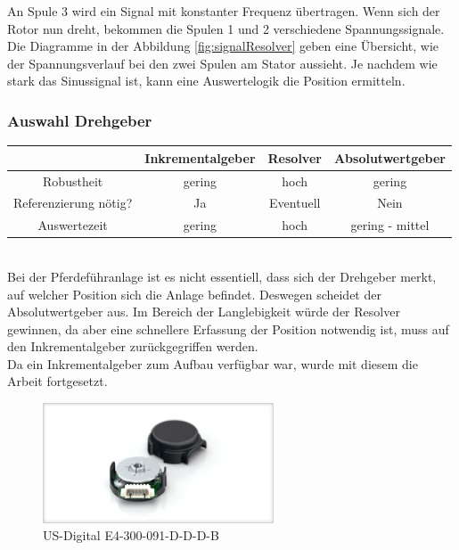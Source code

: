 An Spule 3 wird ein Signal mit konstanter Frequenz übertragen. Wenn sich der Rotor nun dreht, bekommen die Spulen 1 und 2  verschiedene Spannungssignale. Die Diagramme in der Abbildung \ref{fig:signalResolver} geben eine Übersicht, wie der Spannungsverlauf bei den zwei Spulen am Stator aussieht. Je nachdem wie stark das Sinussignal ist, kann eine Auswertelogik die Position ermitteln.

\subsubsection{Auswahl Drehgeber}
\label{sec:auswahlDrehgeber}

\begin{tabular}{|c|c|c|c|}
\hline 
   & Inkrementalgeber & Resolver & Absolutwertgeber \\ 
\hline 
Robustheit & gering & hoch & gering \\ 
\hline 
Referenzierung nötig? & Ja & Eventuell & Nein \\ 
\hline 
Auswertezeit & gering & hoch & gering - mittel \\ 
\hline 
\end{tabular} \\


Bei der Pferdeführanlage ist es nicht essentiell, dass sich der Drehgeber merkt, auf welcher Position sich die Anlage befindet. Deswegen scheidet der Absolutwertgeber aus. Im Bereich der Langlebigkeit würde der Resolver gewinnen, da aber eine schnellere Erfassung der Position notwendig ist, muss auf den Inkrementalgeber zurückgegriffen werden.
\\
Da ein Inkrementalgeber zum Aufbau verfügbar war, wurde mit diesem die Arbeit fortgesetzt.

\begin{figure}[H]
\begin{center}
	\caption{US-Digital E4-300-091-D-D-D-B \label{fig:drehgeberUS} \cite{preisAB}}
	\includegraphics[width=0.61\textwidth]{fig/drehgeberUS}
\end{center}
\end{figure}

